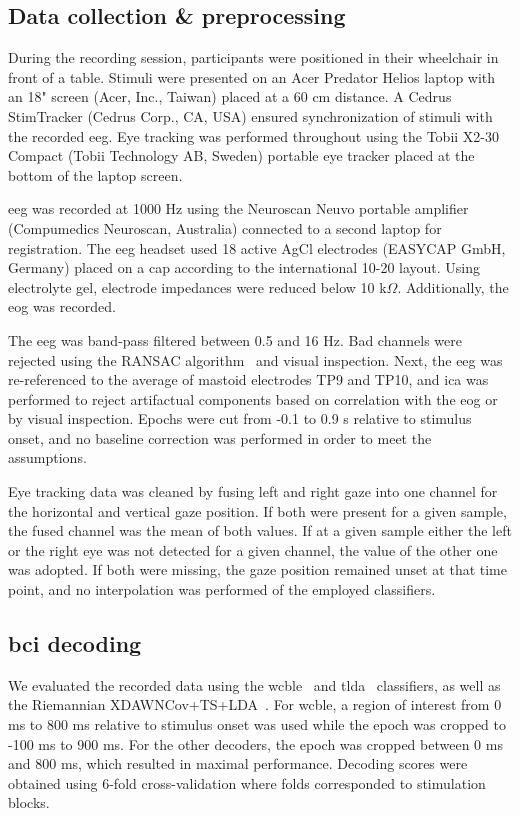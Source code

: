 \subsection{Data collection \& preprocessing}

During the recording session, participants were positioned in their wheelchair in front of a table.
Stimuli were presented on an Acer Predator Helios laptop with an 18" screen (Acer,
Inc., Taiwan) placed at a 60 cm distance.
A Cedrus StimTracker (Cedrus Corp., CA, USA) ensured synchronization of stimuli with the
recorded \ac{eeg}.
Eye tracking was performed throughout using the Tobii X2-30 Compact (Tobii
Technology AB, Sweden) portable eye tracker placed at the bottom of the laptop screen.

\Ac{eeg} was recorded at 1000 Hz using the Neuroscan Neuvo portable amplifier (Compumedics Neuroscan,
Australia) connected to a second laptop for registration.
The \ac{eeg} headset used 18 active AgCl electrodes (EASYCAP GmbH, Germany) placed on a cap
according to the international 10-20 layout.
Using electrolyte gel, electrode impedances were reduced below 10 k$\Omega$.
Additionally, the \ac{eog} was recorded.

The \ac{eeg} was band-pass filtered between 0.5 and 16 Hz.
Bad channels were rejected using the RANSAC algorithm~\cite{Fischler1981}
and visual inspection.
Next, the \ac{eeg} was re-referenced to the average of mastoid electrodes TP9
and TP10, and \ac{ica} was performed to reject artifactual components based on
correlation with the \ac{eog} or by visual inspection.
Epochs were cut from -0.1 to 0.9 s relative to stimulus onset, and no baseline
correction was performed in order to meet the assumptions.

Eye tracking data was cleaned by fusing left and right gaze into one channel
for the horizontal and vertical gaze position.
If both were present for a given sample, the fused channel was the mean of both
values.
If at a given sample either the left or the right eye was not detected for a
given channel, the value of the other one was adopted.
If both were missing, the gaze position remained unset at that time point, and no
interpolation was performed of the employed classifiers.

\subsection{\Acs{bci} decoding}

We evaluated the recorded data using the \ac{wcble}~\cite{VanDenKerchove2024}
and \ac{tlda}~\cite{Sosulski2022}
classifiers, as well as the Riemannian XDAWNCov+TS+LDA~\cite{Cecotti2017}.
For \ac{wcble}, a region of interest from 0 ms to 800 ms relative to stimulus
onset was used while the epoch was cropped to -100 ms to 900 ms. For the other
decoders, the epoch was cropped between 0 ms and 800 ms, which resulted in maximal
performance.
Decoding scores were obtained using 6-fold cross-validation where folds corresponded to
stimulation blocks.

